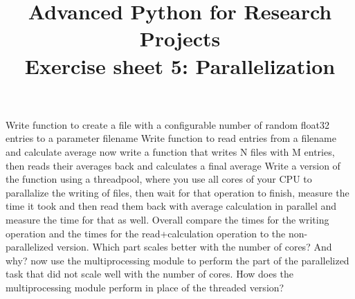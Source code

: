 \documentclass[]{erlangen-problemset}
\title{{\Large Advanced Python for Research Projects} \\[0.3cm] 
Exercise sheet 5: Parallelization}
\begin{document}


\begin{problem}[title={Parallelization in python}]
\noindent
\Question Write function to create a file with a configurable number of random float32 entries to a parameter filename
\Question Write function to read entries from a filename and calculate average
\Question now write a function that writes N files with M entries, then reads their averages back and calculates a final average
\Question Write a version of the function using a threadpool, where you use all cores of your CPU to parallalize the writing of files, then wait for that operation to finish, measure the time it took and then read them back with average calculation in parallel and measure the time for that as well. 
Overall compare the times for the writing operation and the times for the read+calculation operation to the non-parallelized version. Which part scales better with the number of cores? And why?
\Question now use the multiprocessing module to perform the part of the parallelized task that did not scale well with the number of cores.
\Question How does the multiprocessing module perform in place of the threaded version?
\end{problem}
\end{document}
